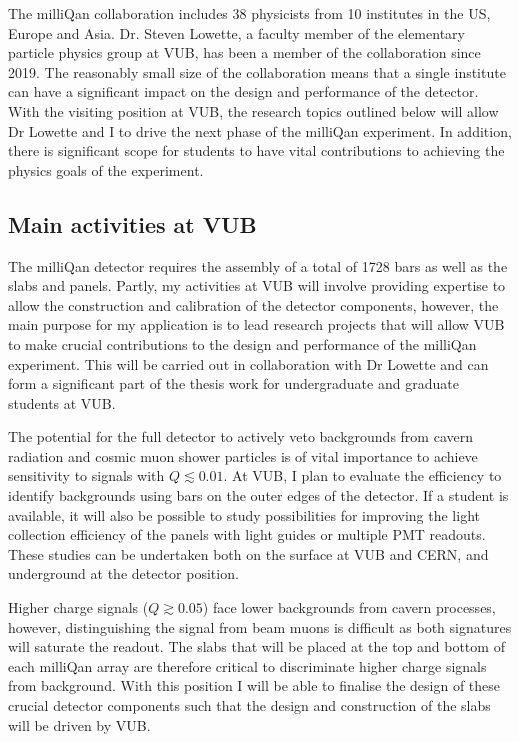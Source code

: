 \documentclass[11pt]{article}
\theoremstyle{plain} \numberwithin{equation}{section}
\theoremstyle{definition}
\begin{document}
The milliQan collaboration includes 38 physicists from 10 institutes in the US, 
Europe and Asia. Dr. Steven Lowette, a faculty member of the elementary particle 
physics group at VUB, has been a member of the collaboration since
2019. The reasonably small size of the collaboration means that a single institute
can have a significant impact on the design and performance of the detector. 
With the visiting position at VUB, the research topics outlined below
will allow Dr Lowette and I to drive 
the next phase of the milliQan experiment. In addition,
there is significant scope for students to have vital contributions to 
achieving the physics goals of the experiment.  

\subsection*{Main activities at VUB}

The milliQan detector requires the assembly of a total of 1728 bars as well
as the slabs and panels. Partly, my activities at VUB will involve 
providing expertise to allow the construction and calibration of the detector components, 
however, the main purpose for my application is
to lead research projects that will allow VUB to make crucial contributions to
the design and performance of the milliQan experiment. 
This will be carried out in collaboration with Dr Lowette and
can form a significant part of the thesis work for undergraduate and graduate
students at VUB.

The potential for the full detector to actively veto backgrounds from cavern radiation
and cosmic muon shower particles is of vital importance to 
achieve sensitivity to signals with $Q \lesssim 0.01$. At VUB, I plan to 
evaluate the efficiency to identify backgrounds using 
bars on the outer edges of the detector. If a student is available, it will also
be possible to study possibilities for improving the light collection efficiency of the panels 
with light guides or multiple PMT readouts. These studies can be undertaken 
both on the surface at VUB and CERN, and underground at the detector position.

Higher charge signals ($Q \gtrsim 0.05$) face lower backgrounds from cavern processes,
however, distinguishing the signal from beam muons is difficult as both 
signatures will saturate the readout. The slabs that will be placed at the top and bottom 
of each milliQan array are therefore critical to discriminate higher charge signals from background.
With this position I will be able to finalise the design of these crucial detector components such that the 
design and construction of the slabs will be driven by VUB.
\end{document}
